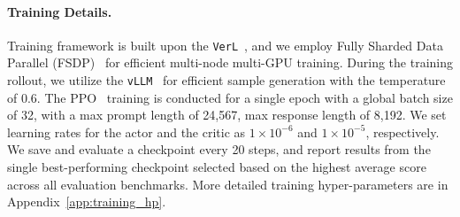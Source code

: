 \documentclass[10pt, a4paper, logo]{googledeepmind} %
\begin{document}
\begin{table}[!h]
\centering
\caption{Statistics of the training dataset, where we report the number of training samples, average query length, the number of retrieved documents per query, the average document length, and the proportion of documents that are irrelevant to the query. The large variance in document counts and lengths, together with the high ratio of irrelevant documents, highlights the realism and difficulty of our training setup.}
\label{tab:training_datasets_stats}
\end{table}


\paragraph{Training Details.}
Training framework is built upon the \texttt{VerL}~\citep{Sheng_2025}, and we employ Fully Sharded Data Parallel (FSDP)~\citep{zhao2023pytorchfsdpexperiencesscaling} for efficient multi-node multi-GPU training. During the training rollout, we utilize the \texttt{vLLM}~\citep{kwon2023efficientmemorymanagementlarge} for efficient sample generation with the temperature of 0.6. The PPO~\citep{schulman2017proximalpolicyoptimizationalgorithms} training is conducted for a single epoch with a global batch size of 32, with a max prompt length of 24,567, max response length of 8,192. We set learning rates for the actor and the critic as $1\times10^{-6}$ and $1\times10^{-5}$, respectively. We save and evaluate a checkpoint every 20 steps, and report results from the single best-performing checkpoint selected based on the highest average score across all evaluation benchmarks. More detailed training hyper-parameters are in Appendix~\ref{app:training_hp}.
\end{document}
